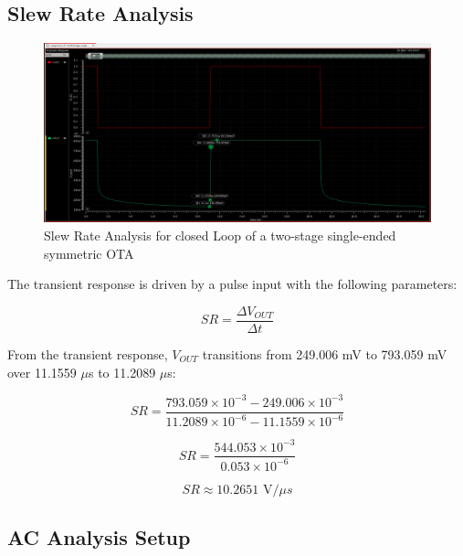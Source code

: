 \subsection{Slew Rate Analysis}
    \begin{figure}[h]
        \centering
           \includegraphics[width=1\textwidth]{images/two_stage_ota_close_slew.png}
        \caption{Slew Rate Analysis for closed Loop of a two-stage single-ended symmetric OTA  }
        \label{fig: }
    \end{figure}

The transient response is driven by a pulse input with the following parameters:

\begin{equation}
    SR = \frac{\Delta V_{OUT}}{\Delta t}
\end{equation}

From the transient response, $V_{OUT}$ transitions from 249.006 mV to 793.059 mV over 11.1559 $\mu$s to 11.2089 $\mu$s:

\begin{equation}
    SR = \frac{793.059 \times 10^{-3} - 249.006 \times 10^{-3}}{ 11.2089  \times 10^{-6} -  11.1559 \times 10^{-6}}
\end{equation}

\begin{equation}
    SR = \frac{544.053 \times 10^{-3}}{0.053 \times 10^{-6}}
\end{equation}

\begin{equation}
    SR \approx 10.2651 \text{ V/} \mu s
\end{equation}

\subsection{AC Analysis Setup}


